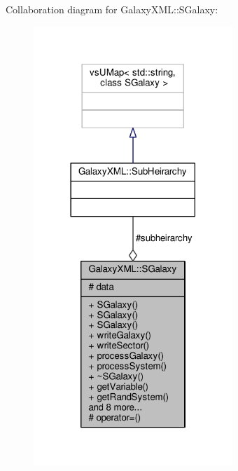 Collaboration diagram for Galaxy\+X\+ML\+:\+:S\+Galaxy\+:
\nopagebreak
\begin{figure}[H]
\begin{center}
\leavevmode
\includegraphics[width=213pt]{d7/df6/classGalaxyXML_1_1SGalaxy__coll__graph}
\end{center}
\end{figure}
